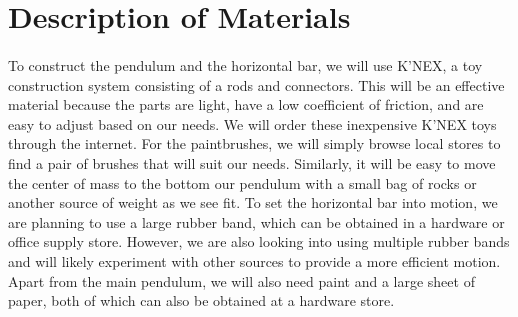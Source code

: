 \documentclass[12pt]{article}
\begin{document}
\section{Description of Materials}

\paragraph{} To construct the pendulum and the horizontal bar, we will use K'NEX, a toy construction system consisting of a rods and connectors. This will be an effective material because the parts are light, have a low coefficient of friction, and are easy to adjust based on our needs. We will order these inexpensive K'NEX toys through the internet. For the paintbrushes, we will simply browse local stores to find a pair of brushes that will suit our needs. Similarly, it will be easy to move the center of mass to the bottom our pendulum with a small bag of rocks or another source of weight as we see fit. To set the horizontal bar into motion, we are planning to use a large rubber band, which can be obtained in a hardware or office supply store. However, we are also looking into using multiple rubber bands and will likely experiment with other sources to provide a more efficient motion. Apart from the main pendulum, we will also need paint and a large sheet of paper, both of which can also be obtained at a hardware store.
\end{document}
